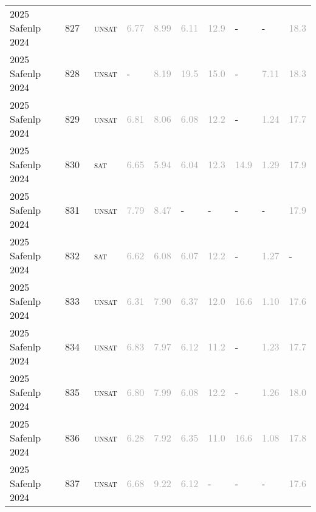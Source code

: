 \begin{center}
{\begin{longtable}{@{}llllllllll@{}}
2025 Safenlp 2024 & 827 & ~\textsc{unsat} & \textcolor{darkgray}{6.77} & \textcolor{darkgray}{8.99} & \textcolor{darkgray}{6.11} & \textcolor{darkgray}{12.9} & - & - & \textcolor{darkgray}{18.3} \\
2025 Safenlp 2024 & 828 & ~\textsc{unsat} & - & \textcolor{darkgray}{8.19} & \textcolor{darkgray}{19.5} & \textcolor{darkgray}{15.0} & - & \textcolor{darkgray}{7.11} & \textcolor{darkgray}{18.3} \\
2025 Safenlp 2024 & 829 & ~\textsc{unsat} & \textcolor{darkgray}{6.81} & \textcolor{darkgray}{8.06} & \textcolor{darkgray}{6.08} & \textcolor{darkgray}{12.2} & - & \textcolor{darkgray}{1.24} & \textcolor{darkgray}{17.7} \\
2025 Safenlp 2024 & 830 & ~\textsc{sat} & \textcolor{darkgray}{6.65} & \textcolor{darkgray}{5.94} & \textcolor{darkgray}{6.04} & \textcolor{darkgray}{12.3} & \textcolor{darkgray}{14.9} & \textcolor{darkgray}{1.29} & \textcolor{darkgray}{17.9} \\
2025 Safenlp 2024 & 831 & ~\textsc{unsat} & \textcolor{darkgray}{7.79} & \textcolor{darkgray}{8.47} & - & - & - & - & \textcolor{darkgray}{17.9} \\
2025 Safenlp 2024 & 832 & ~\textsc{sat} & \textcolor{darkgray}{6.62} & \textcolor{darkgray}{6.08} & \textcolor{darkgray}{6.07} & \textcolor{darkgray}{12.2} & - & \textcolor{darkgray}{1.27} & - \\
2025 Safenlp 2024 & 833 & ~\textsc{unsat} & \textcolor{darkgray}{6.31} & \textcolor{darkgray}{7.90} & \textcolor{darkgray}{6.37} & \textcolor{darkgray}{12.0} & \textcolor{darkgray}{16.6} & \textcolor{darkgray}{1.10} & \textcolor{darkgray}{17.6} \\
2025 Safenlp 2024 & 834 & ~\textsc{unsat} & \textcolor{darkgray}{6.83} & \textcolor{darkgray}{7.97} & \textcolor{darkgray}{6.12} & \textcolor{darkgray}{11.2} & - & \textcolor{darkgray}{1.23} & \textcolor{darkgray}{17.7} \\
2025 Safenlp 2024 & 835 & ~\textsc{unsat} & \textcolor{darkgray}{6.80} & \textcolor{darkgray}{7.99} & \textcolor{darkgray}{6.08} & \textcolor{darkgray}{12.2} & - & \textcolor{darkgray}{1.26} & \textcolor{darkgray}{18.0} \\
2025 Safenlp 2024 & 836 & ~\textsc{unsat} & \textcolor{darkgray}{6.28} & \textcolor{darkgray}{7.92} & \textcolor{darkgray}{6.35} & \textcolor{darkgray}{11.0} & \textcolor{darkgray}{16.6} & \textcolor{darkgray}{1.08} & \textcolor{darkgray}{17.8} \\
2025 Safenlp 2024 & 837 & ~\textsc{unsat} & \textcolor{darkgray}{6.68} & \textcolor{darkgray}{9.22} & \textcolor{darkgray}{6.12} & - & - & - & \textcolor{darkgray}{17.6} \\

\end{longtable}}
\end{center}
